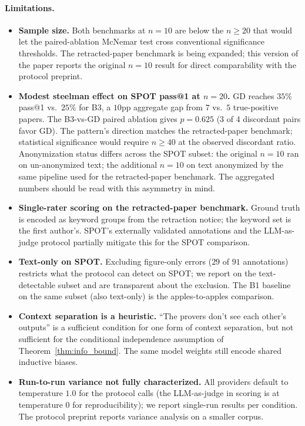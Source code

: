 \documentclass[11pt]{article}
\theoremstyle{definition}
\begin{document}
\paragraph{Limitations.}
\begin{itemize}[nosep]
\item \textbf{Sample size.} Both benchmarks at $n=10$ are below the $n \geq 20$ that would let the paired-ablation McNemar test cross conventional significance thresholds. The retracted-paper benchmark is being expanded; this version of the paper reports the original $n=10$ result for direct comparability with the protocol preprint.
\item \textbf{Modest steelman effect on SPOT pass@1 at $n=20$.} GD reaches $35\%$ pass@1 vs.\ $25\%$ for B3, a $10$pp aggregate gap from $7$ vs.\ $5$ true-positive papers. The B3-vs-GD paired ablation gives $p=0.625$ (3 of 4 discordant pairs favor GD). The pattern's direction matches the retracted-paper benchmark; statistical significance would require $n \geq 40$ at the observed discordant ratio. Anonymization status differs across the SPOT subset: the original $n=10$ ran on un-anonymized text; the additional $n=10$ on text anonymized by the same pipeline used for the retracted-paper benchmark. The aggregated numbers should be read with this asymmetry in mind.
\item \textbf{Single-rater scoring on the retracted-paper benchmark.} Ground truth is encoded as keyword groups from the retraction notice; the keyword set is the first author's. SPOT's externally validated annotations and the LLM-as-judge protocol partially mitigate this for the SPOT comparison.
\item \textbf{Text-only on SPOT.} Excluding figure-only errors ($29$ of $91$ annotations) restricts what the protocol can detect on SPOT; we report on the text-detectable subset and are transparent about the exclusion. The B1 baseline on the same subset (also text-only) is the apples-to-apples comparison.
\item \textbf{Context separation is a heuristic.} ``The provers don't see each other's outputs'' is a sufficient condition for one form of context separation, but not sufficient for the conditional independence assumption of Theorem~\ref{thm:info_bound}. The same model weights still encode shared inductive biases.
\item \textbf{Run-to-run variance not fully characterized.} All providers default to temperature $1.0$ for the protocol calls (the LLM-as-judge in scoring is at temperature $0$ for reproducibility); we report single-run results per condition. The protocol preprint reports variance analysis on a smaller corpus.
\end{itemize}
\end{document}
